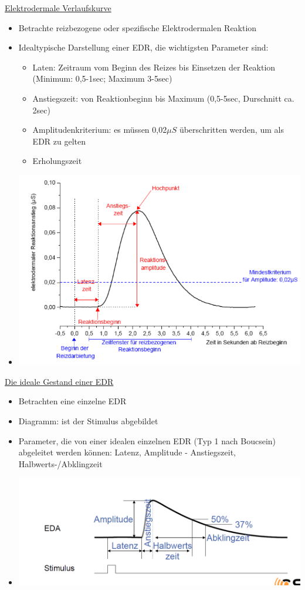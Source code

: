 \documentclass[a4paper,10pt,oneside]{article}
\begin{document}
\underline{Elektrodermale Verlaufskurve} \\
	\begin{itemize}
		\item Betrachte reizbezogene oder spezifische Elektrodermalen Reaktion
		\item Idealtypische Darstellung einer EDR, die wichtigsten Parameter sind:
			\begin{itemize}
				\item Laten: Zeitraum vom Beginn des Reizes bis Einsetzen der Reaktion (Minimum: 0,5-1sec; Maximum 3-5sec)
				\item Anstiegszeit: von Reaktionbeginn bis Maximum (0,5-5sec, Durschnitt ca. 2sec)
				\item Amplitudenkriterium: es müssen 0,02$\mu S$ überschritten werden, um als EDR zu gelten
				\item Erholungszeit 
			\end{itemize}
		\item[] \includegraphics[scale=0.2]{Grafiken/1733.png}
	\end{itemize}
	
\underline{Die ideale Gestand einer EDR} \\
	\begin{itemize}
		\item Betrachten eine einzelne EDR
		\item Diagramm: ist der Stimulus abgebildet
		\item Parameter, die von einer idealen einzelnen EDR (Typ 1 nach Boucsein) abgeleitet werden können: Latenz, Amplitude - Anstiegszeit, Halbwerts-/Abklingzeit
		\item[] \includegraphics[scale=0.2]{Grafiken/1734.png}
	\end{itemize}
\end{document}
